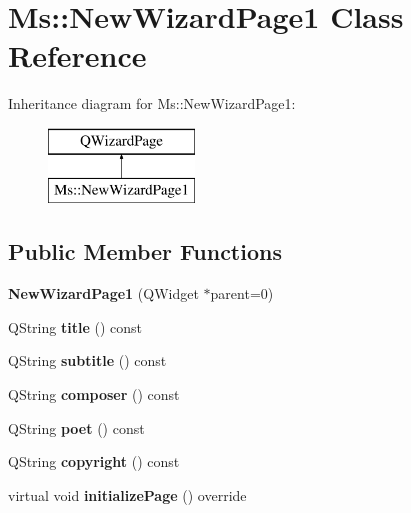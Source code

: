 \hypertarget{class_ms_1_1_new_wizard_page1}{}\section{Ms\+:\+:New\+Wizard\+Page1 Class Reference}
\label{class_ms_1_1_new_wizard_page1}
Inheritance diagram for Ms\+:\+:New\+Wizard\+Page1\+:\begin{figure}[H]
\begin{center}
\leavevmode
\includegraphics[height=2.000000cm]{class_ms_1_1_new_wizard_page1}
\end{center}
\end{figure}
\subsection*{Public Member Functions}
\begin{DoxyCompactItemize}
\item 
\mbox{\label{class_ms_1_1_new_wizard_page1_aea5ef4db04caab998bab781dcafe6066}} 
{\bfseries New\+Wizard\+Page1} (Q\+Widget $\ast$parent=0)
\item 
\mbox{\label{class_ms_1_1_new_wizard_page1_af5483082c1131d122921637219ea97e4}} 
Q\+String {\bfseries title} () const
\item 
\mbox{\label{class_ms_1_1_new_wizard_page1_aa58e4f0ae51a95e22f4aeeeabf88e5d8}} 
Q\+String {\bfseries subtitle} () const
\item 
\mbox{\label{class_ms_1_1_new_wizard_page1_ab756c99d876910436429ef84e9e21b04}} 
Q\+String {\bfseries composer} () const
\item 
\mbox{\label{class_ms_1_1_new_wizard_page1_ab99825fa88dbee1d01c99cd824f8fdda}} 
Q\+String {\bfseries poet} () const
\item 
\mbox{\label{class_ms_1_1_new_wizard_page1_a8d535f4accebf58907765a65e27b1d84}} 
Q\+String {\bfseries copyright} () const
\item 
\mbox{\label{class_ms_1_1_new_wizard_page1_a6d30c1255488ed6d4cb39cffcd32b1f6}} 
virtual void {\bfseries initialize\+Page} () override
\end{DoxyCompactItemize}


